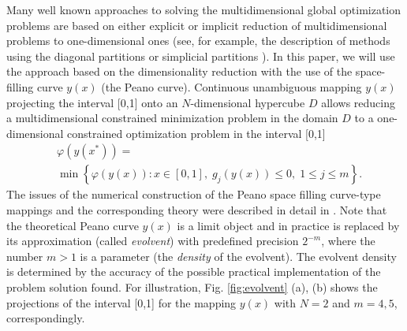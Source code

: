 \documentclass[twocolumn]{svjour3}          %
\begin{document}
	Many well known approaches to solving the multidimensional global optimization problems are based on either explicit or implicit reduction of multidimensional problems to one-dimensional ones (see, for example, the description of methods using the diagonal partitions \cite{Sergeyev2006} or simplicial partitions \cite{Zilinskas2008}). In this paper, we will use the approach based on the dimensionality reduction with the use of the space-filling curve $y(x)$ (the Peano curve). Continuous unambiguous mapping $y(x)$ projecting the interval [0,1] onto an $N$-dimensional hypercube $D$ allows reducing a multidimensional constrained minimization problem in the domain $D$ to a one-dimensional constrained optimization problem in the interval [0,1]
\begin{align}\label{one_dimensional_problem}
	& \varphi(y(x^\ast)) =  \nonumber \\
	& \min \left\{\varphi(y(x)): x \in [0,1], \; g_j(y(x))\leq 0, \; 1 \leq j \leq m\right\}.
\end{align}
The issues of the numerical construction of the Peano space filling curve-type mappings and the corresponding theory were described in detail in \cite{Strongin2000,Sergeyev2013}. Note that the theoretical Peano curve $y(x)$ is a limit object and in practice is replaced by its approximation (called \textit{evolvent}) with predefined precision $2^{-m}$, where the number $m>1$ is a parameter (the \textit{density} of the evolvent). The evolvent density is determined by the accuracy of the possible practical implementation of the problem solution found. For  illustration, Fig. \ref{fig:evolvent} (a), (b) shows the projections of the interval [0,1] for the mapping $y(x)$ with $N=2$ and $m=4,5$, correspondingly.
\end{document}
